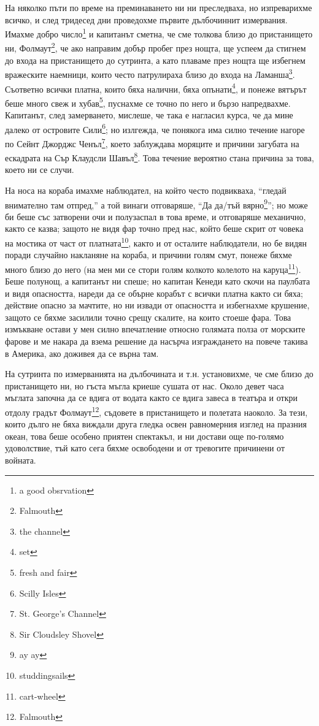 \documentclass[12pt]{book}
\begin{document}
На няколко пъти по време на преминаването ни ни преследваха, но изпреварихме всичко, и след тридесед дни проведохме първите дълбочиннит измервания. Имахме добро число\footnote{a good obsrvation} и капитанът сметна, че сме толкова близо до пристанището ни, Фолмаут\footnote{Falmouth}, че ако направим добър пробег през нощта, ще успеем да стигнем до входа на пристанището до сутринта, а като плаваме през нощта ще избегнем вражеските наемници, които често патрулираха близо до входа на Ламанша\footnote{the channel}. Съответно всички платна, които бяха налични, бяха опънати\footnote{set}, и понеже вятърът беше много свеж и хубав\footnote{fresh and fair}, пуснахме се точно по него и бързо напредвахме. Капитанът, след замерването, мислеше, че така е нагласил курса, че да мине далеко от островите Сили\footnote{Scilly Isles}; но излгежда, че понякога има силно течение нагоре по Сейнт Джорджс Ченъл\footnote{St. George's Channel}, което заблуждава моряците и причини загубата на ескадрата на Сър Клаудсли Шавъл\footnote{Sir Cloudsley Shovel}. Това течение вероятно стана причина за това, което ни се случи. 

На носа на кораба имахме наблюдател, на който често подвикваха, “гледай внимателно там отпред,” а той винаги отговаряше, “Да да/тъй вярно\footnote{ay ay}”; но може би беше със затворени очи и полузаспал в това време, и отговаряше механично, както се казва; защото не видя фар точно пред нас, който беше скрит от човека на мостика от част от платната\footnote{studdingsails}, както и от осталите наблюдатели, но бе видян поради случайно накланяне на кораба, и причини голям смут, понеже бяхме много близо до него (на мен ми се стори голям колкото колелото на каруца\footnote{cart-wheel}). Беше полунощ, а капитанът ни спеше; но капитан Кенеди като скочи на паулбата и видя опасността, нареди да се обърне корабът с всички платна както си бяха; действие опасно за мачтите, но ни извади от опасността и избегнахме крушение, защото се бяхме засилили точно срещу скалите, на които стоеше фара. Това измъкване остави у мен силно впечатление относно голямата полза от морските фарове и ме накара да взема решение да насърча изграждането на повече такива в Америка, ако доживея да се върна там. 

На сутринта по измерванията на дълбочината и т.н. установихме, че сме близо до пристанището ни, но гъста мъгла криеше сушата от нас. Около девет часа мъглата започна да се вдига от водата както се вдига завеса в театъра и откри отдолу градът Фолмаут\footnote{Falmouth}, съдовете в пристанището и полетата наоколо. За тези, които дълго не бяха виждали друга гледка освен равномерния изглед на празния океан, това беше особено приятен спектакъл, и ни достави още по-голямо удоволствие, тъй като сега бяхме освободени и от тревогите причинени от войната.
\end{document}
